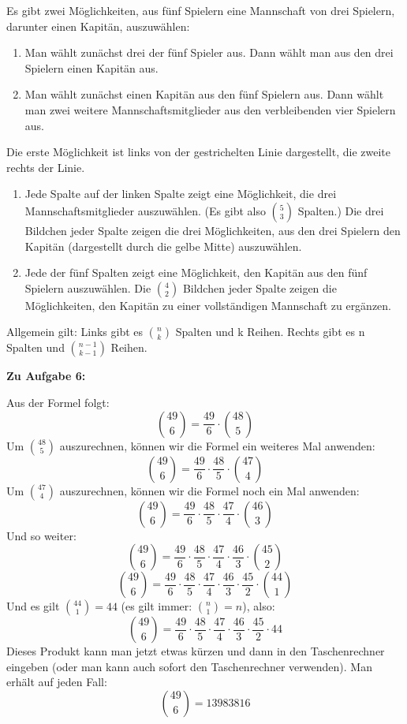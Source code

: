 \documentclass{article}
\begin{document}
Es gibt zwei Möglichkeiten, aus fünf Spielern eine Mannschaft von drei Spielern, darunter einen Kapitän, auszuwählen:

\begin{enumerate}
  \item Man wählt zunächst drei der fünf Spieler aus. Dann wählt man aus den drei Spielern einen Kapitän aus.
  \item Man wählt zunächst einen Kapitän aus den fünf Spielern aus. Dann wählt man zwei weitere Mannschaftsmitglieder aus den verbleibenden vier Spielern aus.
\end{enumerate}

Die erste Möglichkeit ist links von der gestrichelten Linie dargestellt, die zweite rechts der Linie.

\begin{enumerate}
  \item Jede Spalte auf der linken Spalte zeigt eine Möglichkeit, die drei Mannschaftsmitglieder auszuwählen. (Es gibt also $\binom{5}{3}$ Spalten.) Die drei Bildchen jeder Spalte zeigen die drei Möglichkeiten, aus den drei Spielern den Kapitän (dargestellt durch die gelbe Mitte) auszuwählen.
  \item Jede der fünf Spalten zeigt eine Möglichkeit, den Kapitän aus den fünf Spielern auszuwählen. Die $\binom{4}{2}$ Bildchen jeder Spalte zeigen die Möglichkeiten, den Kapitän zu einer vollständigen Mannschaft zu ergänzen.
\end{enumerate}

Allgemein gilt: Links gibt es $\binom{n}{k}$ Spalten und k Reihen. Rechts gibt es n Spalten und $\binom{n-1}{k-1}$ Reihen.


\textbf{Zu Aufgabe 6:}

Aus der Formel folgt:
\[ \binom{49}{6} = \frac{49}{6} \cdot \binom{48}{5} \]
Um $\binom{48}{5}$ auszurechnen, können wir die Formel ein weiteres Mal anwenden:
\[ \binom{49}{6} = \frac{49}{6} \cdot \frac{48}{5} \cdot \binom{47}{4} \]
Um $\binom{47}{4}$ auszurechnen, können wir die Formel noch ein Mal anwenden:
\[ \binom{49}{6} = \frac{49}{6} \cdot \frac{48}{5} \cdot \frac{47}{4} \cdot \binom{46}{3} \]
Und so weiter:
\[ \binom{49}{6} = \frac{49}{6} \cdot \frac{48}{5} \cdot \frac{47}{4} \cdot \frac{46}{3} \cdot \binom{45}{2} \]
\[ \binom{49}{6} = \frac{49}{6} \cdot \frac{48}{5} \cdot \frac{47}{4} \cdot \frac{46}{3} \cdot \frac{45}{2} \cdot \binom{44}{1} \]
Und es gilt $\binom{44}{1} = 44$ (es gilt immer: $\binom{n}{1} = n$), also:
\[ \binom{49}{6} = \frac{49}{6} \cdot \frac{48}{5} \cdot \frac{47}{4} \cdot \frac{46}{3} \cdot \frac{45}{2} \cdot 44 \]
Dieses Produkt kann man jetzt etwas kürzen und dann in den Taschenrechner eingeben (oder man kann auch sofort den Taschenrechner verwenden). Man erhält auf jeden Fall:
\[ \binom{49}{6} = 13983816 \]
\end{document}
